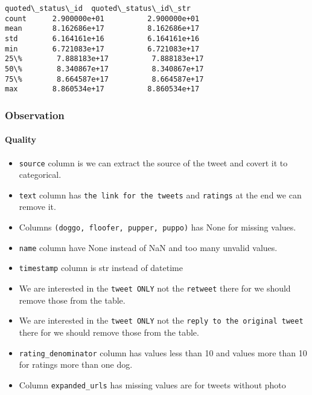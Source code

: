 \documentclass[11pt]{article}
\providecommand{\tightlist}{%
      \setlength{\itemsep}{0pt}\setlength{\parskip}{0pt}}
\begin{document}
\begin{tcolorbox}[breakable, size=fbox, boxrule=.5pt, pad at break*=1mm, opacityfill=0]
\begin{Verbatim}[commandchars=\\\{\}]
       quoted\_status\_id  quoted\_status\_id\_str
count      2.900000e+01          2.900000e+01
mean       8.162686e+17          8.162686e+17
std        6.164161e+16          6.164161e+16
min        6.721083e+17          6.721083e+17
25\%        7.888183e+17          7.888183e+17
50\%        8.340867e+17          8.340867e+17
75\%        8.664587e+17          8.664587e+17
max        8.860534e+17          8.860534e+17
\end{Verbatim}
\end{tcolorbox}
        
    \hypertarget{observation}{%
\subsubsection{Observation}\label{observation}}

    \hypertarget{quality}{%
\paragraph{Quality}\label{quality}}

\begin{itemize}
\tightlist
\item
  \texttt{source} column is we can extract the source of the tweet and
  covert it to categorical.
\item
  \texttt{text} column has \texttt{the\ link\ for\ the\ tweets} and
  \texttt{ratings} at the end we can remove it.
\item
  Columns \texttt{(doggo,\ floofer,\ pupper,\ puppo)} has None for
  missing values.
\item
  \texttt{name} column have None instead of NaN and too many unvalid
  values.
\item
  \texttt{timestamp} column is str instead of datetime
\item
  We are interested in the \texttt{tweet\ ONLY} not the \texttt{retweet}
  there for we should remove those from the table.
\item
  We are interested in the \texttt{tweet\ ONLY} not the
  \texttt{reply\ to\ the\ original\ tweet} there for we should remove
  those from the table.
\item
  \texttt{rating\_denominator} column has values less than 10 and values
  more than 10 for ratings more than one dog.
\item
  Column \texttt{expanded\_urls} has missing values are for tweets
  without photo
\end{itemize}
\end{document}

